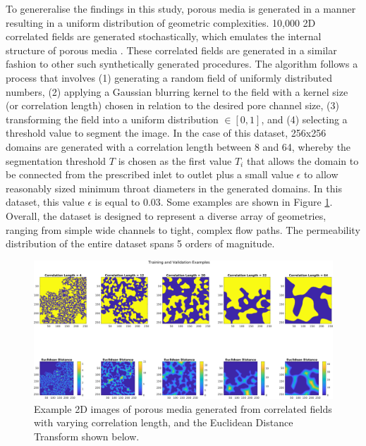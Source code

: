 \documentclass{article}
\begin{document}
To genereralise the findings in this study, porous media is generated in a manner resulting in a uniform distribution of geometric complexities. 10,000 2D correlated fields are generated stochastically, which emulates the internal structure of porous media \cite{LIU2017121}. These correlated fields are generated in a similar fashion to other such synthetically generated procedures. The algorithm follows a process that involves (1) generating a random field of uniformly distributed numbers, (2) applying a Gaussian blurring kernel to the field with a kernel size (or correlation length) chosen in relation to the desired pore channel size, (3) transforming the field into a uniform distribution $\in [0,1]$, and (4) selecting a threshold value to segment the image. In the case of this dataset, 256x256 domains are generated with a correlation length between 8 and 64, whereby the segmentation threshold $T$ is chosen as the first value $T_{i}$ that allows the domain to be connected from the prescribed inlet to outlet plus a small value $\epsilon$ to allow reasonably sized minimum throat diameters in the generated domains. In this dataset, this value $\epsilon$ is equal to 0.03. Some examples are shown in Figure \ref{fig:exampleFields}. Overall, the dataset is designed to represent a diverse array of geometries, ranging from simple wide channels to tight, complex flow paths. The permeability distribution of the entire dataset spans 5 orders of magnitude.

\begin{figure}[htp!]
  \centering
    \includegraphics[width=\textwidth]{./figures/exampleFields.png}
    \caption{Example 2D images of porous media generated from correlated fields with varying correlation length, and the Euclidean Distance Transform shown below.}
    \label{fig:exampleFields}
\end{figure}
\end{document}
